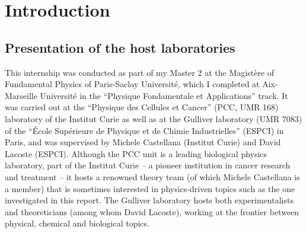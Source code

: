 \section{Introduction}
\subsection{Presentation of the host laboratories}
\myindent This internship was conducted as part of my Master 2 at the Magistère of Fundamental Physics of Paris-Saclay Université, which I
completed at Aix-Marseille Université in the ``Physique Fondamentale et Applications'' track. It was carried out at the
``Physique des Cellules et Cancer'' (PCC, UMR 168) laboratory of the Institut Curie as well as at the Gulliver laboratory (UMR 7083)
of the ``École Supérieure de Physique et de Chimie Industrielles'' (ESPCI) in Paris, and was supervised by Michele Castellana
(Institut Curie) and David Lacoste (ESPCI). Although the PCC unit is a leading biological physics laboratory, part of the
Institut Curie -- a pioneer institution in cancer research and treatment -- it hosts a renowned theory team (of which Michele Castellana
is a member) that is sometimes interested in physics-driven topics such as the one investigated in this report. The Gulliver
 laboratory hosts both experimentalists and theoreticians (among whom David Lacoste), working at the frontier between physical,
 chemical and biological topics.

